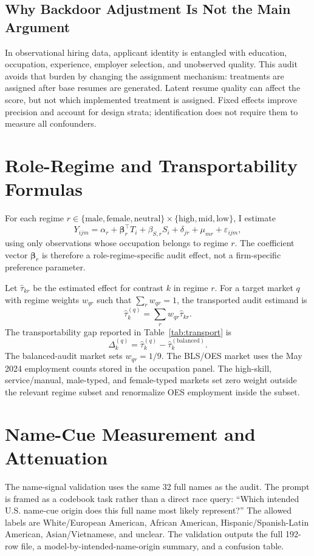 \documentclass[10pt,twocolumn,letterpaper]{article}
\begin{document}
\subsection{Why Backdoor Adjustment Is Not the Main Argument}

In observational hiring data, applicant identity is entangled with education, occupation, experience, employer selection, and unobserved quality. This audit avoids that burden by changing the assignment mechanism: treatments are assigned after base resumes are generated. Latent resume quality can affect the score, but not which implemented treatment is assigned. Fixed effects improve precision and account for design strata; identification does not require them to measure all confounders.

\section{Role-Regime and Transportability Formulas}
\label{app:transport}

For each regime $r \in \{\text{male},\text{female},\text{neutral}\}\times\{\text{high},\text{mid},\text{low}\}$, I estimate
\[
Y_{ijm}=\alpha_r+\bm{\beta}_r^\top T_i+\beta_{S,r}S_i+\delta_{jr}+\mu_{mr}+\varepsilon_{ijm},
\]
using only observations whose occupation belongs to regime $r$. The coefficient vector $\bm{\beta}_r$ is therefore a role-regime-specific audit effect, not a firm-specific preference parameter.

Let $\hat\tau_{kr}$ be the estimated effect for contrast $k$ in regime $r$. For a target market $q$ with regime weights $w_{qr}$ such that $\sum_r w_{qr}=1$, the transported audit estimand is
\[
\hat\tau_{k}^{(q)}=\sum_r w_{qr}\hat\tau_{kr}.
\]
The transportability gap reported in Table~\ref{tab:transport} is
\[
\Delta_k^{(q)}=\hat\tau_k^{(q)}-\hat\tau_k^{(\mathrm{balanced})}.
\]
The balanced-audit market sets $w_{qr}=1/9$. The BLS/OES market uses the May 2024 employment counts stored in the occupation panel. The high-skill, service/manual, male-typed, and female-typed markets set zero weight outside the relevant regime subset and renormalize OES employment inside the subset.

\section{Name-Cue Measurement and Attenuation}
\label{app:namecue}

The name-signal validation uses the same 32 full names as the audit. The prompt is framed as a codebook task rather than a direct race query: ``Which intended U.S. name-cue origin does this full name most likely represent?'' The allowed labels are White/European American, African American, Hispanic/Spanish-Latin American, Asian/Vietnamese, and unclear. The validation outputs the full 192-row file, a model-by-intended-name-origin summary, and a confusion table.
\end{document}
